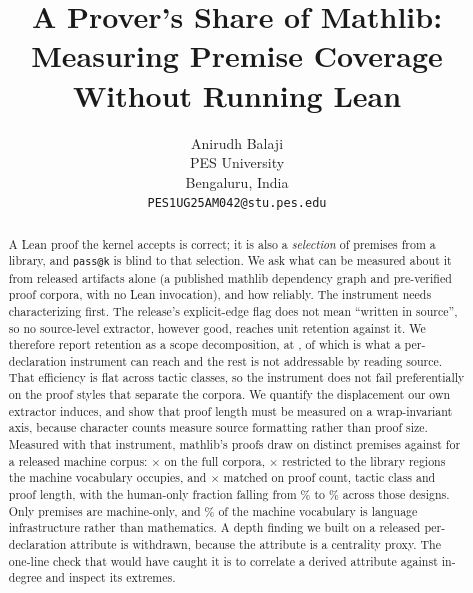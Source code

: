 \documentclass{article}
\title{A Prover's Share of Mathlib: Measuring Premise Coverage
Without Running Lean}
\author{%
  Anirudh Balaji \\
  PES University \\
  Bengaluru, India \\
  \texttt{PES1UG25AM042@stu.pes.edu} \\
}
\begin{document}
\maketitle

\begin{abstract}
  A Lean proof the kernel accepts is correct; it is also a \emph{selection} of
  premises from a library, and \texttt{pass@k} is blind to that selection. We
  ask what can be measured about it from released artifacts alone (a
  published mathlib dependency graph and pre-verified proof corpora, with no
  Lean invocation), and how reliably. The instrument needs characterizing
  first. The release's explicit-edge flag does not mean ``written in source'',
  so no source-level extractor, however good, reaches unit retention against
  it. We therefore report retention as a scope decomposition, at \retention{}, of
  which \efficiencyReachable{} is what a per-declaration instrument can reach
  and the rest is not addressable by reading source. That efficiency is
  flat across tactic classes, so the instrument does not fail preferentially on
  the proof styles that separate the corpora. We quantify the displacement our
  own extractor induces, and show that proof length must be measured on a
  wrap-invariant axis, because character counts measure source formatting
  rather than proof size. Measured
  with that instrument, mathlib's proofs draw on \humanVocab{} distinct
  premises against \machineVocab{} for a released machine corpus:
  \vocabRatio{}$\times$ on the full corpora, \areaRestrictedRatio{}$\times$
  restricted to the library regions the machine vocabulary occupies, and
  \vocabRatioMatched{}$\times$ matched on proof count, tactic class and proof
  length, with the human-only fraction falling from \humanOnlyFullPct{}\% to
  \humanOnlyMatchedPct{}\% across those designs. Only \machineOnlyFull{}
  premises are machine-only, and \machineVocabInfraPct{}\% of the machine
  vocabulary is language infrastructure rather than mathematics. A depth
  finding we built on a released per-declaration attribute is withdrawn,
  because the attribute is a centrality proxy. The one-line check that would
  have caught it is to correlate a derived attribute against in-degree and
  inspect its extremes.
\end{abstract}




\end{document}
